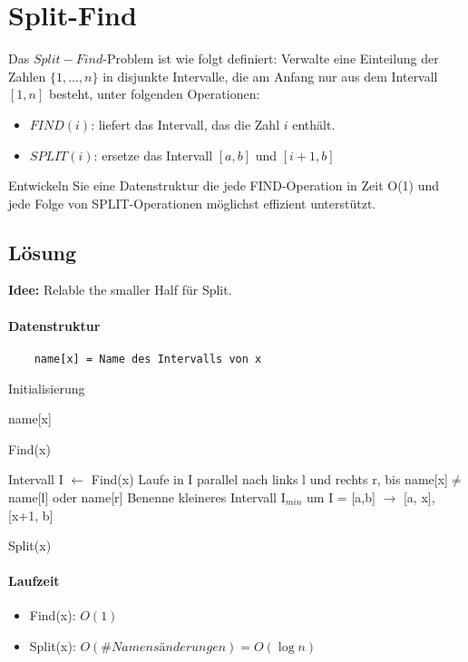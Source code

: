 \section{Split-Find}
	Das $Split-Find$-Problem ist wie folgt definiert: Verwalte eine Einteilung der Zahlen $\{1,...,n\}$ in disjunkte Intervalle, die am Anfang nur aus dem Intervall $[1,n]$ besteht, unter folgenden Operationen:
	\begin{itemize}
		\item $FIND(i)$: liefert das Intervall, das die Zahl $i$ enthält.
		\item $SPLIT(i)$: ersetze das Intervall $[a,b]$ und $[i+1,b]$
	\end{itemize}
	Entwickeln Sie eine Datenstruktur die jede FIND-Operation in Zeit O(1) und jede Folge von SPLIT-Operationen möglichst effizient unterstützt.

\subsection*{Lösung}
\textbf{Idee:} Relable the smaller Half für Split.
\paragraph{Datenstruktur}
\begin{verbatim}
    name[x] = Name des Intervalls von x
\end{verbatim}

\begin{algorithm}
\SetAlgoLined
{}
\caption{Initialisierung}
\end{algorithm}
\vspace{5mm}

\begin{algorithm}
\SetAlgoLined
\Return name[x]\;
\caption{Find(x)}
\end{algorithm}
\vspace{5mm}

\begin{algorithm}
\SetAlgoLined
Intervall I $ \gets $ Find(x)\;
Laufe in I parallel nach links l und rechts r, bis name[x]$ \neq $ name[l] oder name[r]\;
Benenne kleineres Intervall I$_{min} $ um\;
I = [a,b] $\rightarrow$ [a, x], [x+1, b]\;
\caption{Split(x)}
\end{algorithm}

\paragraph{Laufzeit}
\begin{itemize}
    \item[] Find(x): $ O(1) $
    \item[] Split(x): $ O(\# Namensänderungen) = O(\log n) $
\end{itemize}


